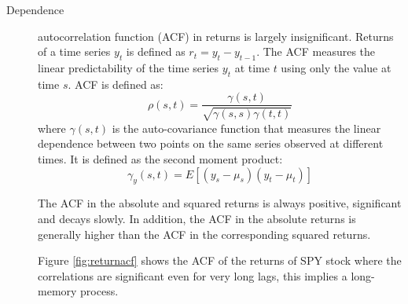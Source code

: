 \begin{description}
\item[Dependence] autocorrelation function (ACF) in returns is largely
insignificant. Returns of a time series $y_t$ is defined as $r_t = y_t -
y_{t-1}$. The ACF measures the linear predictability of the time series $y_t$ at
time $t$ using only the value at time $s$. ACF is defined as:
\begin{equation*}
\rho(s,t) = \frac{\gamma(s,t)}{\sqrt{\gamma(s,s)\gamma(t,t)}}
\end{equation*}
\noindent where $\gamma(s,t)$ is the auto-covariance function that measures the
linear dependence between two points on the same series observed at different
times. It is defined as the second moment product:
\begin{equation*}
\gamma_y(s,t) = E[(y_s-\mu_s)(y_t - \mu_t)]
\end{equation*}

The ACF in the absolute and squared returns is always positive,
significant and decays slowly. In addition, the ACF in the absolute
returns is generally higher than the ACF in the corresponding
squared returns. 

Figure \ref{fig:returnacf} shows the ACF of the returns of SPY stock where the
correlations are significant even for very long lags, this implies a long-memory
process.
 

\end{description}
